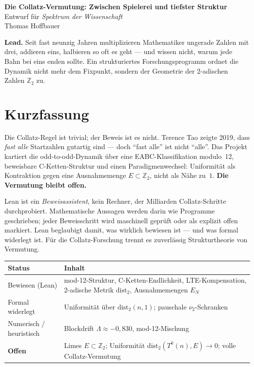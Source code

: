 \documentclass[11pt,a4paper]{article}
\newcommand{\Ztwo}{\mathbb{Z}_2}
\begin{document}
\begin{center}
  {\LARGE\bfseries Die Collatz-Vermutung: Zwischen Spielerei und tiefster Struktur}\\[0.6em]
  {\normalsize Entwurf für \emph{Spektrum der Wissenschaft}}\\[1em]
  {\normalsize Thomas Hoffbauer}\\[1.2em]
\end{center}

\noindent\textbf{Lead.}
Seit fast neunzig Jahren multiplizieren Mathematiker ungerade Zahlen mit drei,
addieren eins, halbieren so oft es geht --- und wissen nicht, warum jede Bahn
bei eins enden sollte. Ein strukturiertes Forschungsprogramm ordnet die Dynamik
nicht mehr dem Fixpunkt, sondern der Geometrie der 2-adischen Zahlen $\Ztwo$ zu.

\section*{Kurzfassung}

Die Collatz-Regel ist trivial; der Beweis ist es nicht. Terence Tao zeigte 2019,
dass \emph{fast alle} Startzahlen gutartig sind --- doch ``fast alle'' ist nicht
``alle''. Das Projekt kartiert die odd-to-odd-Dynamik über eine EABC-Klassifikation
modulo~12, beweisbare C-Ketten-Struktur und einen Paradigmenwechsel: Uniformität
als Kontraktion gegen eine Ausnahmemenge $E\subset\Ztwo$, nicht als Nähe zu~$1$.
\textbf{Die Vermutung bleibt offen.}

\begin{tcolorbox}[infobox,title={Was ist Lean?}]
Lean ist ein \emph{Beweisassistent}, kein Rechner, der Milliarden Collatz-Schritte
durchprobiert. Mathematische Aussagen werden darin wie Programme geschrieben;
jeder Beweisschritt wird maschinell geprüft oder als explizit offen markiert.
Lean beglaubigt damit, was wirklich bewiesen ist --- und was formal widerlegt ist.
Für die Collatz-Forschung trennt es zuverlässig Strukturtheorie von Vermutung.
\end{tcolorbox}

\begin{tcolorbox}[infobox,title={Was ist formalisiert?}]
\begin{center}
\renewcommand{\arraystretch}{1.25}
\begin{tabular}{@{}p{}p{}@{}}
\toprule
\textbf{Status} & \textbf{Inhalt} \\
\midrule
Bewiesen (Lean) &
mod-12-Struktur, C-Ketten-Endlichkeit, LTE-Kompensation,
2-adische Metrik $\mathrm{dist}_2$, Ausnahmemengen $E_N$ \\
Formal widerlegt &
Uniformität über $\mathrm{dist}_2(n,1)$; pauschale $\nu_2$-Schranken \\
Numerisch / heuristisch &
Blockdrift $\Lambda\approx -0{,}830$, mod-12-Mischung \\
\textbf{Offen} &
Limes $E\subset\Ztwo$; Uniformität $\mathrm{dist}_2(T^k(n),E)\to 0$;
volle Collatz-Vermutung \\
\bottomrule
\end{tabular}
\end{center}
\end{tcolorbox}
\end{document}
